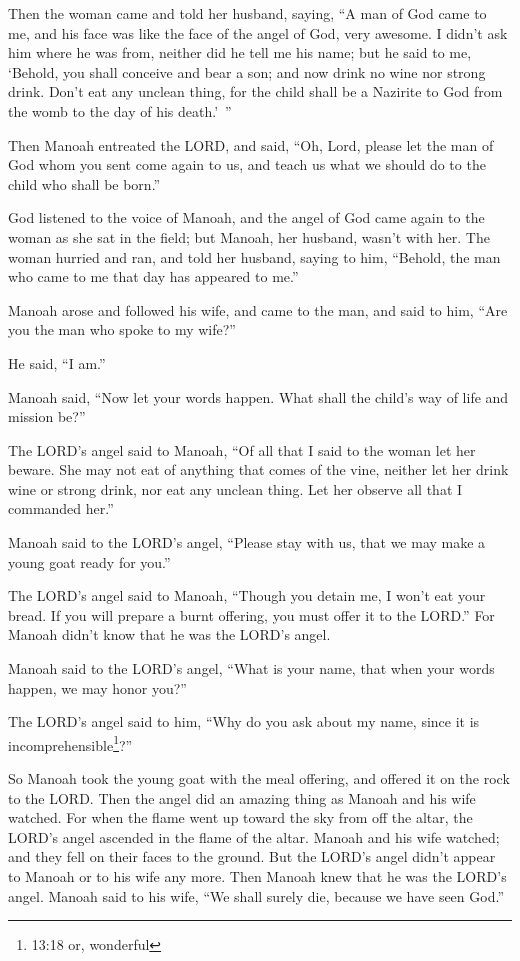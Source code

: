 \myverse{}Then the woman came and told her husband, saying, “A man of God
came to me, and his face was like the face of the angel of God, very awesome. I didn’t ask him where he
was from, neither did he tell me his name;
\myverse{}but he said to me, ‘Behold, you shall conceive and bear a son; and now drink
no wine nor strong drink. Don’t eat any unclean thing, for the child shall be a Nazirite to God from the
womb to the day of his death.’ ”

\myverse{}Then Manoah entreated the LORD, and said, “Oh, Lord, please let
the man of God whom you sent come again to us, and teach us what we should do to the child who shall be
born.”

\myverse{}God listened to the voice of Manoah, and the angel of God came
again to the woman as she sat in the field; but Manoah, her husband, wasn’t with her.
\myverse{}The woman hurried and ran, and told her husband, saying to him, “Behold,
the man who came to me that day has appeared to me.”

\myverse{}Manoah arose and followed his wife, and came to the man, and
said to him, “Are you the man who spoke to my wife?”

He said, “I am.”

\myverse{}Manoah said, “Now let your words happen. What shall the child’s
way of life and mission be?”

\myverse{}The LORD’s angel said to Manoah, “Of all that I said to the
woman let her beware.
\myverse{}She may not eat of anything that comes of the vine, neither let her drink
wine or strong drink, nor eat any unclean thing. Let her observe all that I commanded her.”

\myverse{}Manoah said to the LORD’s angel, “Please stay with us, that
we may make a young goat ready for you.”

\myverse{}The LORD’s angel said to Manoah, “Though you detain me, I won’t
eat your bread. If you will prepare a burnt offering, you must offer it to the LORD.” For Manoah didn’t
know that he was the LORD’s angel.

\myverse{}Manoah said to the LORD’s angel, “What is your name, that when
your words happen, we may honor you?”

\myverse{}The LORD’s angel said to him, “Why do you ask about my name,
since it is incomprehensible\footnote{13:18 or, wonderful}?”

\myverse{}So Manoah took the young goat with the meal offering, and offered
it on the rock to the LORD. Then the angel did an amazing thing as Manoah and his wife watched.
\myverse{}For when the flame went up toward the sky from off the altar, the LORD’s
angel ascended in the flame of the altar. Manoah and his wife watched; and they fell on their faces to
the ground.
\myverse{}But the LORD’s angel didn’t appear to Manoah or to his wife any more. Then
Manoah knew that he was the LORD’s angel.
\myverse{}Manoah said to his wife, “We shall surely die, because we have seen God.”

